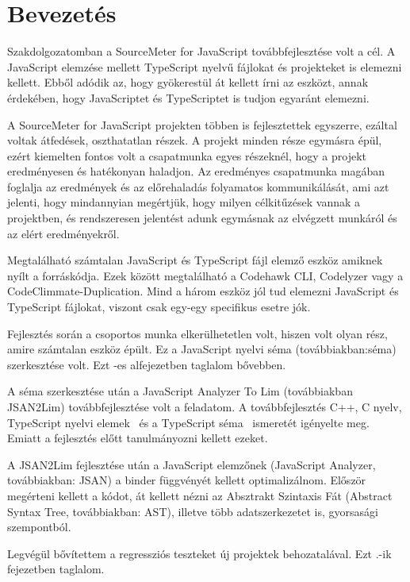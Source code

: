 \chapter{Bevezetés}
Szakdolgozatomban a SourceMeter for JavaScript továbbfejlesztése volt a cél.
A JavaScript elemzése mellett TypeScript nyelvű fájlokat és projekteket is elemezni kellett.
Ebből adódik az, hogy gyökerestül át kellett írni az eszközt, annak érdekében,
hogy JavaScriptet és TypeScriptet is tudjon egyaránt elemezni.


A SourceMeter for JavaScript projekten többen is fejlesztettek egyszerre, ezáltal voltak átfedések, oszthatatlan részek.
A projekt minden része egymásra épül, ezért kiemelten fontos volt a csapatmunka egyes részeknél, hogy a projekt eredményesen és hatékonyan haladjon.
Az eredményes csapatmunka magában foglalja az eredmények és az előrehaladás folyamatos kommunikálását,
ami azt jelenti, hogy mindannyian megértjük, hogy milyen célkitűzések vannak a projektben,
és rendszeresen jelentést adunk egymásnak az elvégzett munkáról és az elért eredményekről.


Megtalálható számtalan JavaScript és TypeScript fájl elemző eszköz amiknek nyílt a forráskódja.
Ezek között megtalálható a Codehawk CLI, Codelyzer vagy a CodeClimmate-Duplication.
Mind a három eszköz jól tud elemezni JavaScript és TypeScript fájlokat, viszont csak egy-egy specifikus esetre jók.


Fejlesztés során a csoportos munka elkerülhetetlen volt, hiszen volt olyan rész, amire számtalan eszköz épült.
Ez a JavaScript nyelvi séma (továbbiakban:séma) szerkesztése volt. Ezt -es alfejezetben taglalom bővebben.


A séma szerkesztése után a JavaScript Analyzer To Lim (továbbiakban JSAN2Lim) továbbfejlesztése volt a feladatom.
A továbbfejlesztés C++, C nyelv, TypeScript nyelvi elemek~\cite{fenton2014pro, cherny2019programming, nance2014typescript, 10.1007/978-3-662-44202-9_11} és a TypeScript séma~\cite{typescript-eslint} ismeretét igényelte meg.
Emiatt a fejlesztés előtt tanulmányozni kellett ezeket.


A JSAN2Lim fejlesztése után a JavaScript elemzőnek (JavaScript Analyzer, továbbiakban: JSAN) a binder függvényét kellett optimalizálnom.
Először megérteni kellett a kódot, át kellett nézni az Absztrakt Szintaxis Fát (Abstract Syntax Tree, továbbiakban: AST), illetve több adatszerkezetet is, gyorsasági szempontból.


Legvégül bővítettem a regressziós teszteket új projektek behozatalával. Ezt .-ik fejezetben taglalom.
